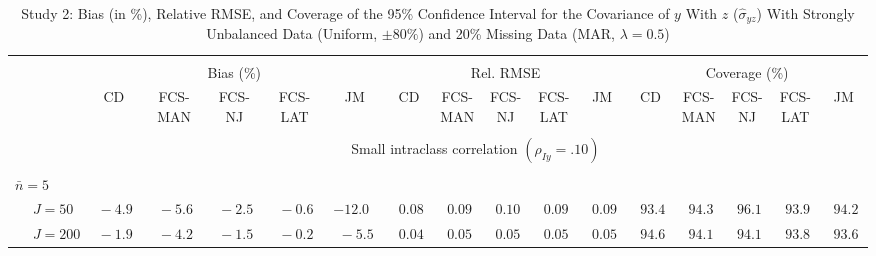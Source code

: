 \begin{sidewaystable}
\begin{threeparttable}
\setlength{\tabcolsep}{1.0pt}
\renewcommand{\arraystretch}{0.95}
\footnotesize
\caption{\small Study 2: Bias (in \%), Relative RMSE, and Coverage of the 95\% Confidence Interval for the Covariance of $y$ With $z$ ($\hat\sigma_{yz}$) With Strongly Unbalanced Data (Uniform, $\pm 80\%$) and 20\% Missing Data (MAR, $\lambda=0.5$)}
\begin{tabular}{llccccccccccccccc}
\hline\\[-1.8ex]
& & \multicolumn{5}{c}{Bias (\%)} & \multicolumn{5}{c}{Rel. RMSE} & \multicolumn{5}{c}{Coverage (\%)} \\ \cmidrule(r){3-7}\cmidrule(r){8-12}\cmidrule(r){13-17}
 &  & CD & \makecell{FCS-\\MAN} & \makecell{FCS-\\NJ} & \makecell{FCS-\\LAT} & JM & CD & \makecell{FCS-\\MAN} & \makecell{FCS-\\NJ} & \makecell{FCS-\\LAT} & JM & CD & \makecell{FCS-\\MAN} & \makecell{FCS-\\NJ} & \makecell{FCS-\\LAT} & \multicolumn{1}{c}{JM} \\ 
[0.4ex]\hline\\[-1.8ex]
& & \multicolumn{15}{c}{Small intraclass correlation $(\rho_{Iy}=.10)$} \\[0.6ex]\hline\\[-1.8ex]
\multicolumn{4}{l}{$\bar{n}=5$} \\  & \nopagebreak $\;J=50$  & $\phantom{0}{-}4.9\phantom{0}$ & $\phantom{0}{-}5.6\phantom{0}$ & $\phantom{0}{-}2.5\phantom{0}$ & $\phantom{0}{-}0.6\phantom{0}$ & ${-}12.0\phantom{0}$ & $\phantom{0}0.08\phantom{0}$ & $\phantom{0}0.09\phantom{0}$ & $\phantom{0}0.10\phantom{0}$ & $\phantom{0}0.09\phantom{0}$ & $\phantom{0}0.09\phantom{0}$ & $\phantom{0}93.4\phantom{0}$ & $\phantom{0}94.3\phantom{0}$ & $\phantom{0}96.1\phantom{0}$ & $\phantom{0}93.9\phantom{0}$ & $\phantom{0}94.2\phantom{0}$ \\
 & \nopagebreak $\;J=200$  & $\phantom{0}{-}1.9\phantom{0}$ & $\phantom{0}{-}4.2\phantom{0}$ & $\phantom{0}{-}1.5\phantom{0}$ & $\phantom{0}{-}0.2\phantom{0}$ & $\phantom{0}{-}5.5\phantom{0}$ & $\phantom{0}0.04\phantom{0}$ & $\phantom{0}0.05\phantom{0}$ & $\phantom{0}0.05\phantom{0}$ & $\phantom{0}0.05\phantom{0}$ & $\phantom{0}0.05\phantom{0}$ & $\phantom{0}94.6\phantom{0}$ & $\phantom{0}94.1\phantom{0}$ & $\phantom{0}94.1\phantom{0}$ & $\phantom{0}93.8\phantom{0}$ & $\phantom{0}93.6\phantom{0}$ \\

\end{tabular}
\end{threeparttable}
\end{sidewaystable}

